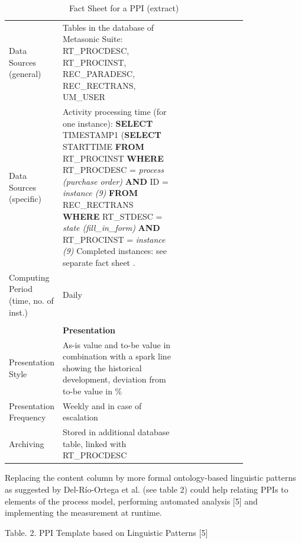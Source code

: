 \begin{table}[htbp]
\begin{tabular}[t]{@{}l p{0.5\linewidth} p{0.3\linewidth} @{}}
		\\
		Data Sources (general) & Tables in the database of Metasonic Suite:
		RT\_PROCDESC, RT\_PROCINST, REC\_PARADESC, REC\_RECTRANS, UM\_USER
		\\
		Data Sources (specific) & Activity processing time (for one instance):\newline
		\textbf{SELECT} TIMESTAMP1  \newline
		(\textbf{SELECT} STARTTIME \newline
		\textbf{FROM} RT\_PROCINST \newline
		\textbf{WHERE} RT\_PROCDESC = \textit{process (purchase order)}\newline
		\textbf{AND} ID = \textit{instance (9)}\newline
		\textbf{FROM} REC\_RECTRANS\newline
		\textbf{WHERE} RT\_STDESC = \textit{\textit{state (fill\_in\_form)}}\newline
		\textbf{AND} RT\_PROCINST = \textit{instance (9)}
		Completed instances: see separate fact sheet .
		\\
		Computing Period (time, no. of inst.) & Daily
		\\
		& &
		\\
		& \textbf{Presentation}
		\\
		Presentation Style & As-is value and to-be value in combination with a spark line showing the historical development, deviation from to-be value in \%
		\\
		Presentation Frequency & Weekly and in case of escalation
		\\
		Archiving & Stored in additional database table, linked with RT\_PROCDESC
		\\
		
\bottomrule
\end{tabular}
\caption{Fact Sheet for a PPI (extract)}
\label{tbl:Fact-Sheet}
\end{table}

Replacing the content column by more formal ontology-based linguistic patterns as suggested by Del-Río-Ortega et al. (see table 2) could help relating PPIs to elements of the process model, performing automated analysis [5] and implementing the measurement at runtime. 




Table. 2.  PPI Template based on Linguistic Patterns [5]


